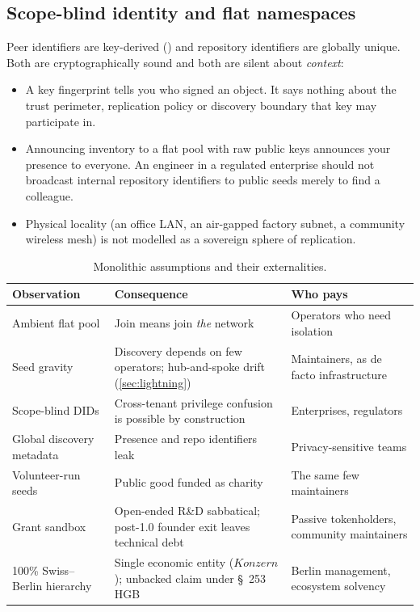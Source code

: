 \documentclass[a4paper,11pt,twoside,parskip=half-,headings=small]{scrartcl}
\begin{document}
\subsection{Scope-blind identity and flat namespaces}
Peer identifiers are key-derived () and repository identifiers are
globally unique. Both are cryptographically sound and both are silent about
\emph{context}:
\begin{itemize}
  \item A key fingerprint tells you who signed an object. It says nothing about the trust
        perimeter, replication policy or discovery boundary that key may participate in.
  \item Announcing inventory to a flat pool with raw public keys announces your presence to
        everyone. An engineer in a regulated enterprise should not broadcast internal
        repository identifiers to public seeds merely to find a colleague.
  \item Physical locality (an office LAN, an air-gapped factory subnet, a community
        wireless mesh) is not modelled as a sovereign sphere of replication.
\end{itemize}

\begin{table}[H]
\centering\small
\begin{tabularx}{\textwidth}{@{}L{3.0cm}YY@{}}
\toprule
\textbf{Observation} & \textbf{Consequence} & \textbf{Who pays} \\
\midrule
Ambient flat pool & Join means join \emph{the} network & Operators who need isolation \\
Seed gravity & Discovery depends on few operators; hub-and-spoke drift (\cref{sec:lightning}) & Maintainers, as de facto infrastructure \\
Scope-blind DIDs & Cross-tenant privilege confusion is possible by construction & Enterprises, regulators \\
Global discovery metadata & Presence and repo identifiers leak & Privacy-sensitive teams \\
Volunteer-run seeds & Public good funded as charity & The same few maintainers \\
Grant sandbox & Open-ended R\&D sabbatical; post-1.0 founder exit leaves technical debt & Passive tokenholders, community maintainers \\
100\% Swiss--Berlin hierarchy & Single economic entity ($Konzern$);  unbacked claim under \S~253 HGB & Berlin management, ecosystem solvency \\
\bottomrule
\end{tabularx}
\caption{Monolithic assumptions and their externalities.}
\end{table}
\end{document}
